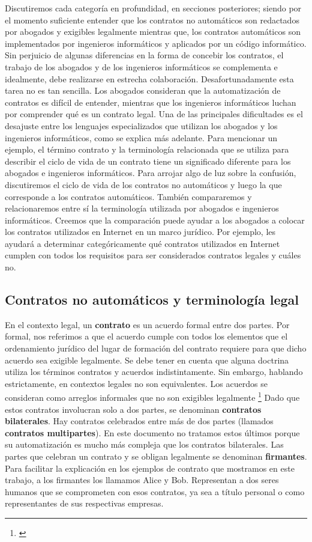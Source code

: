 \documentclass[12pt]{report} %
\begin{document}
Discutiremos cada categoría en profundidad, en secciones posteriores; siendo por el momento suficiente entender que los contratos no automáticos son redactados por abogados y exigibles legalmente mientras que, los contratos automáticos son implementados por ingenieros informáticos y aplicados por un código informático. Sin perjuicio de algunas diferencias en la forma de concebir los contratos, el trabajo de los abogados y de los ingenieros informáticos se complementa e idealmente, debe realizarse en estrecha colaboración. Desafortunadamente esta tarea no es tan sencilla. Los abogados consideran que la automatización de contratos es difícil de entender, mientras que los ingenieros informáticos luchan por comprender qué es un contrato legal. Una de las principales dificultades es el desajuste entre los lenguajes especializados que utilizan los abogados y los ingenieros informáticos, como se explica más adelante. Para mencionar un ejemplo, el término contrato y la terminología relacionada que se utiliza para describir el ciclo de vida de un contrato tiene un significado diferente para los abogados e ingenieros informáticos. Para arrojar algo de luz sobre la confusión, discutiremos el ciclo de vida de los contratos no automáticos y luego la que corresponde a los contratos automáticos. También compararemos y relacionaremos entre sí la terminología utilizada por abogados e ingenieros informáticos. Creemos que la comparación puede ayudar a los abogados a colocar los contratos utilizados en Internet en un marco jurídico. Por ejemplo, les ayudará a determinar categóricamente qué contratos utilizados en Internet cumplen con todos los requisitos para ser considerados contratos legales y cuáles no.



\subsection{Contratos no automáticos y terminología legal}

En el contexto legal, un \textbf{contrato} es un acuerdo formal entre dos partes. Por formal, nos referimos a que el acuerdo cumple con todos los elementos que el ordenamiento jurídico del lugar de formación del contrato requiere para que dicho acuerdo sea exigible legalmente. Se debe tener en cuenta que alguna doctrina utiliza los términos contratos y acuerdos indistintamente. Sin embargo, hablando estrictamente, en contextos legales no son equivalentes. Los acuerdos se consideran como arreglos informales que no son  exigibles legalmente \footnote{\cite{JetForm2021}}
Dado que estos contratos involucran solo a dos partes, se denominan \textbf{contratos bilaterales}. Hay contratos celebrados entre más de dos partes (llamados \textbf{contratos multipartes}). En este documento no tratamos estos últimos porque su automatización es mucho más compleja que los contratos bilaterales. Las partes que celebran un contrato y se obligan legalmente se denominan \textbf{firmantes}. Para facilitar la explicación en los ejemplos de contrato que mostramos en este trabajo, a los firmantes los llamamos Alice y Bob. Representan a dos seres humanos que se comprometen con esos contratos, ya sea a título personal o como representantes de sus respectivas empresas.
\end{document}
